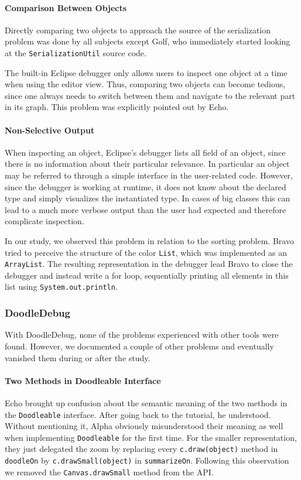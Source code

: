 \documentclass[english]{scrartcl}
\newcommand{\DD}{Dood\-le\-De\-bug\xspace}
\newcommand{\println}{\texttt{Sys\-tem.\-out.\-println}\xspace}
\begin{document}
\paragraph{Comparison Between Objects}
Directly comparing two objects to approach the source of the serialization problem was done by all subjects except Golf, who immediately started looking at the \texttt{SerializationUtil} source code.

The built-in Eclipse debugger only allows users to inspect one object at a time when using the editor view.
Thus, comparing two objects can become tedious, since one always needs to switch between them and navigate to the relevant part in its graph.
This problem was explicitly pointed out by Echo.

\paragraph{Non-Selective Output}
When inspecting an object, Eclipse's debugger lists all field of an object, since there is no information about their particular relevance.
In particular an object may be referred to through a simple interface in the user-related code.
However, since the debugger is working at runtime, it does not know about the declared type and simply visualizes the instantiated type.
In cases of big classes this can lead to a much more verbose output than the user had expected and therefore complicate inspection.

In our study, we observed this problem in relation to the sorting problem.
Bravo tried to perceive the structure of the color \texttt{List}, which was implemented as an \texttt{ArrayList}.
The resulting representation in the debugger lead Bravo to close the debugger and instead write a for loop, sequentially printing all elements in this list using \println.

\subsubsection{DoodleDebug}
With \DD, none of the problems experienced with other tools were found.
However, we documented a couple of other problems and eventually vanished them during or after the study.

\paragraph{Two Methods in Doodleable Interface}
Echo brought up confusion about the semantic meaning of the two methods in the \texttt{Doodleable} interface.
After going back to the tutorial, he understood.
Without mentioning it, Alpha obviously misunderstood their meaning as well when implementing \texttt{Doodleable} for the first time.
For the smaller representation, they just delegated the zoom by replacing every \texttt{c.draw(object)} method in \texttt{doodleOn} by \texttt{c.drawSmall(object)} in \texttt{summarizeOn}.
Following this observation we removed the \texttt{Canvas.drawSmall} method from the API.
\end{document}
